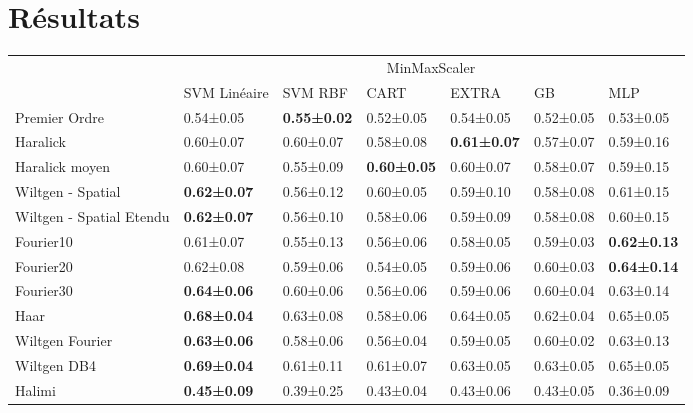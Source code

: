\section{Résultats}
\begin{table}[]
\begin{tabular}{lllllll}
                         & \multicolumn{6}{c}{MinMaxScaler}                                                                                   \\
                         & SVM Linéaire       & SVM RBF            & CART               & EXTRA              & GB        & MLP                \\
Premier Ordre            & 0.54±0.05          & \textbf{0.55±0.02} & 0.52±0.05          & 0.54±0.05          & 0.52±0.05 & 0.53±0.05          \\
Haralick                 & 0.60±0.07          & 0.60±0.07          & 0.58±0.08          & \textbf{0.61±0.07} & 0.57±0.07 & 0.59±0.16          \\
Haralick moyen           & 0.60±0.07          & 0.55±0.09          & \textbf{0.60±0.05} & 0.60±0.07          & 0.58±0.07 & 0.59±0.15          \\
Wiltgen - Spatial        & \textbf{0.62±0.07} & 0.56±0.12          & 0.60±0.05          & 0.59±0.10          & 0.58±0.08 & 0.61±0.15          \\
Wiltgen - Spatial Etendu & \textbf{0.62±0.07} & 0.56±0.10          & 0.58±0.06          & 0.59±0.09          & 0.58±0.08 & 0.60±0.15          \\
Fourier10                & 0.61±0.07          & 0.55±0.13          & 0.56±0.06          & 0.58±0.05          & 0.59±0.03 & \textbf{0.62±0.13} \\
Fourier20                & 0.62±0.08          & 0.59±0.06          & 0.54±0.05          & 0.59±0.06          & 0.60±0.03 & \textbf{0.64±0.14} \\
Fourier30                & \textbf{0.64±0.06} & 0.60±0.06          & 0.56±0.06          & 0.59±0.06          & 0.60±0.04 & 0.63±0.14          \\
Haar                     & \textbf{0.68±0.04} & 0.63±0.08          & 0.58±0.06          & 0.64±0.05          & 0.62±0.04 & 0.65±0.05          \\
Wiltgen Fourier          & \textbf{0.63±0.06} & 0.58±0.06          & 0.56±0.04          & 0.59±0.05          & 0.60±0.02 & 0.63±0.13          \\
Wiltgen DB4              & \textbf{0.69±0.04} & 0.61±0.11          & 0.61±0.07          & 0.63±0.05          & 0.63±0.05 & 0.65±0.05          \\
Halimi                   & \textbf{0.45±0.09} & 0.39±0.25          & 0.43±0.04          & 0.43±0.06          & 0.43±0.05 & 0.36±0.09         
\end{tabular}
\end{table}

